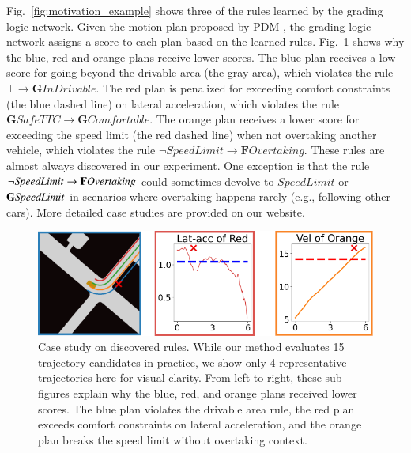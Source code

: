 Fig.~\ref{fig:motivation_example} shows three of the rules learned by the grading logic network. Given the motion plan proposed by PDM \cite{Dauner2023CORL}, the grading logic network assigns a score to each plan based on the learned rules. Fig.~\ref{fig:case-study-example} shows why the \textcolor[HTML]{2278B4}{blue}, \textcolor[HTML]{D52928}{red} and \textcolor[HTML]{F98217}{orange} plans receive lower scores. The blue plan receives a low score for going beyond the drivable area (the gray area), which violates the rule $\top \rightarrow \mathbf{G} \mathit{InDrivable}$. The red plan is penalized for exceeding comfort constraints (the blue dashed line) on lateral acceleration, which violates the rule $\mathbf{G} \mathit{SafeTTC} \rightarrow \mathbf{G} \mathit{Comfortable}$. The orange plan receives a lower score for exceeding the speed limit (the red dashed line) when not overtaking another vehicle, which violates the rule $\lnot \mathit{SpeedLimit} \rightarrow \mathbf{F} \mathit{Overtaking}$. These rules are almost always discovered in our experiment. One exception is that the rule $\lnot \mathit{SpeedLimit} \rightarrow \mathbf{F} \mathit{Overtaking}$ could sometimes devolve to  $\mathit{SpeedLimit}$ or $\mathbf{G} \mathit{SpeedLimit}$   in scenarios where overtaking happens rarely (e.g., following other cars). More detailed case studies are provided on our website.

\begin{figure}[h!]
    \centering
    \includegraphics[width=\linewidth]{imgs/case_study.drawio.png}
    \caption{
        Case study on discovered rules. While our method evaluates 15 trajectory candidates in practice, we show only 4 representative trajectories here for visual clarity. From left to right, these sub-figures explain why the blue, red, and orange plans received lower scores. The blue plan violates the drivable area rule, the red plan exceeds comfort constraints on lateral acceleration, and the orange plan breaks the speed limit without overtaking context.
    }
    \label{fig:case-study-example}
\end{figure}



